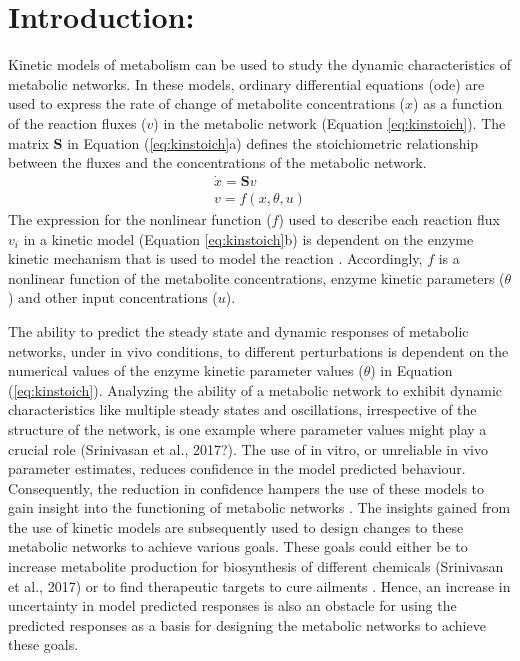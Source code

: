 \documentclass[10pt]{article}
\begin{document}
\section{Introduction:}
Kinetic models of metabolism can be used to study the dynamic characteristics of metabolic networks. In these models, ordinary differential equations (ode) are used to express the rate of change of metabolite concentrations ($x$) as a function of the reaction fluxes ($v$) in the metabolic network (Equation \ref{eq:kinstoich}). The matrix $\mathbf{S}$ in Equation (\ref{eq:kinstoich}a) defines the stoichiometric relationship between the fluxes and the concentrations of the metabolic network.
\begin{subequations}\label{eq:kinstoich}
	\begin{align}
	\dot{x} = \mathbf{S}v\\
	v = f(x, \theta, u)
	\end{align}
\end{subequations}
The expression for the nonlinear function ($f$) used to describe each reaction flux $v_i$ in a kinetic model (Equation \ref{eq:kinstoich}b) is dependent on the enzyme kinetic mechanism that is used to model the reaction \parencite{Heijnen2005, Link2014, Machado2011, Srinivasan2015}. Accordingly, $f$ is a nonlinear function of the metabolite concentrations, enzyme kinetic parameters ($\theta$) and other input concentrations ($u$). 

The ability to predict the steady state and dynamic responses of metabolic networks, under in vivo conditions, to different perturbations is dependent on the numerical values of the enzyme kinetic parameter values ($\theta$) in Equation (\ref{eq:kinstoich}). Analyzing the ability of a metabolic network to exhibit dynamic characteristics like multiple steady states and oscillations, irrespective of the structure of the network, is one example where parameter values might play a crucial role \parencite{Srinivasan2015, Vital-Lopez2006}(Srinivasan et al., 2017?). The use of in vitro, or unreliable in vivo parameter estimates, reduces confidence in the model predicted behaviour. Consequently, the reduction in confidence hampers the use of these models to gain insight into the functioning of metabolic networks \parencite{Tran2008, Chakrabarti2013a}. The insights gained from the use of kinetic models are subsequently used to design changes to these metabolic networks to achieve various goals. These goals could either be to increase metabolite production for biosynthesis of different chemicals \parencite{Almquist2014, Khodayari2016, Costa2016, Andreozzi2016}(Srinivasan et al., 2017) or to find therapeutic targets to cure ailments \parencite{Apaolaza2017}. Hence, an increase in uncertainty in model predicted responses is also an obstacle for using the predicted responses as a basis for designing the metabolic networks to achieve these goals.  
\end{document}
